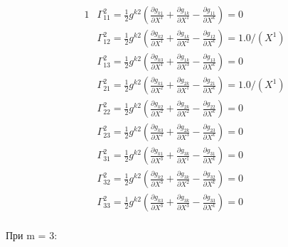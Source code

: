 \documentclass{article}
\begin{document}
\begin{alignat*}{1}
  & \Gamma^2_{11} = \frac{1}{2}g^{k2}(\frac{\partial g_{k1}}{\partial X^1} + \frac{\partial g_{1k}}{\partial X^1} - \frac{\partial g_{11}}{\partial X^k}) = 0 \\
  & \Gamma^2_{12} = \frac{1}{2}g^{k2}(\frac{\partial g_{k2}}{\partial X^1} + \frac{\partial g_{1k}}{\partial X^2} - \frac{\partial g_{12}}{\partial X^k}) = 1.0/(X^1) \\
  & \Gamma^2_{13} = \frac{1}{2}g^{k2}(\frac{\partial g_{k3}}{\partial X^1} + \frac{\partial g_{1k}}{\partial X^3} - \frac{\partial g_{13}}{\partial X^k}) = 0 \\
  & \Gamma^2_{21} = \frac{1}{2}g^{k2}(\frac{\partial g_{k1}}{\partial X^2} + \frac{\partial g_{2k}}{\partial X^1} - \frac{\partial g_{21}}{\partial X^k}) = 1.0/(X^1) \\
  & \Gamma^2_{22} = \frac{1}{2}g^{k2}(\frac{\partial g_{k2}}{\partial X^2} + \frac{\partial g_{2k}}{\partial X^2} - \frac{\partial g_{22}}{\partial X^k}) = 0 \\
  & \Gamma^2_{23} = \frac{1}{2}g^{k2}(\frac{\partial g_{k3}}{\partial X^2} + \frac{\partial g_{2k}}{\partial X^3} - \frac{\partial g_{23}}{\partial X^k}) = 0 \\
  & \Gamma^2_{31} = \frac{1}{2}g^{k2}(\frac{\partial g_{k1}}{\partial X^3} + \frac{\partial g_{3k}}{\partial X^1} - \frac{\partial g_{31}}{\partial X^k}) = 0 \\
  & \Gamma^2_{32} = \frac{1}{2}g^{k2}(\frac{\partial g_{k2}}{\partial X^3} + \frac{\partial g_{3k}}{\partial X^2} - \frac{\partial g_{32}}{\partial X^k}) = 0 \\
  & \Gamma^2_{33} = \frac{1}{2}g^{k2}(\frac{\partial g_{k3}}{\partial X^3} + \frac{\partial g_{3k}}{\partial X^3} - \frac{\partial g_{33}}{\partial X^k}) = 0 
\end{alignat*}\\
При m = 3:\\
\end{document}
